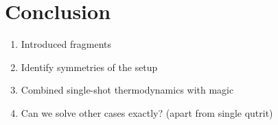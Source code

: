 \documentclass[pra,
aps,
twocolumn,
superscriptaddress,
groupedaddress,
nofootinbib,
reprint
]{revtex4-1}
\begin{document}

\section{Conclusion}
\label{sec:conc}

\begin{enumerate}
    \item Introduced fragments
    \item Identify symmetries of the setup
    \item Combined single-shot thermodynamics with magic 
    \item Can we solve other cases exactly? (apart from single qutrit)
\end{enumerate}



%


\appendix

\end{document}
